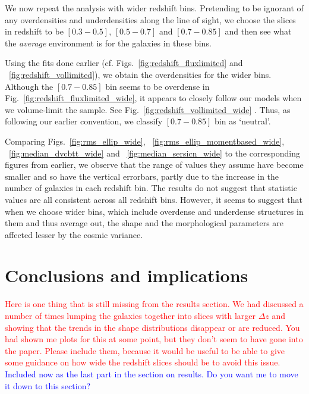 \documentclass[twocolumn,useAMS,usenatbib]{mn2e}
\newcommand{\rachel}[1]{{\textcolor{red}{#1}}}
\newcommand{\arun}[1]{{\textcolor{blue}{#1}}}
\begin{document}
We now repeat the analysis with wider redshift bins. Pretending to be ignorant of any overdensities and underdensities along the line of sight, we choose the slices in redshift to be $\left[ 0.3 - 0.5 \right]$,
$\left[ 0.5 - 0.7\right]$ and $\left[ 0.7 - 0.85\right]$ and then see what the \emph{average} environment is for the galaxies in these bins.

Using the fits done earlier (cf. Figs.~\ref{fig:redshift_fluxlimited} and ~\ref{fig:redshift_vollimited}), we obtain the overdensities for the wider bins.
Although the $\left[ 0.7 - 0.85\right]$ bin seems to be overdense in Fig.~\ref{fig:redshift_fluxlimited_wide}, it appears to closely follow our models when we volume-limit the sample.
See Fig.~\ref{fig:redshift_vollimited_wide} . Thus, as following our earlier convention, we classify $\left[ 0.7 - 0.85\right]$ bin as `neutral'.

Comparing Figs.~\ref{fig:rms_ellip_wide}, ~\ref{fig:rms_ellip_momentbased_wide}, ~\ref{fig:median_dvcbtt_wide} and ~\ref{fig:median_sersicn_wide} to the corresponding figures from earlier, we observe that the 
range of values they assume have become smaller and so have the vertical errorbars, partly due to the increase in the number of galaxies in each redshift bin. The results do not suggest that statistic values
are all consistent across all redshift bins. However, it seems to suggest that when we choose wider bins, which include overdense and underdense structures in them and thus average out,
the shape and the morphological parameters are affected lesser by the cosmic variance.

\section{Conclusions and implications}
\label{S:summary}

\rachel{Here is one thing that is still missing from the results
  section.  We had discussed a number of times lumping the galaxies
  together into slices with larger $\Delta z$ and showing that the
  trends in the shape distributions disappear or are reduced.  You had
  shown me plots for this at some point, but they don't seem to have
  gone into the paper.  Please include them, because it would be
  useful to be able to give some guidance on how wide the redshift
  slices should be to avoid this issue.}
\arun{Included now as the last part in the section on results. Do you want me to move it down to this section?}  
\end{document}
